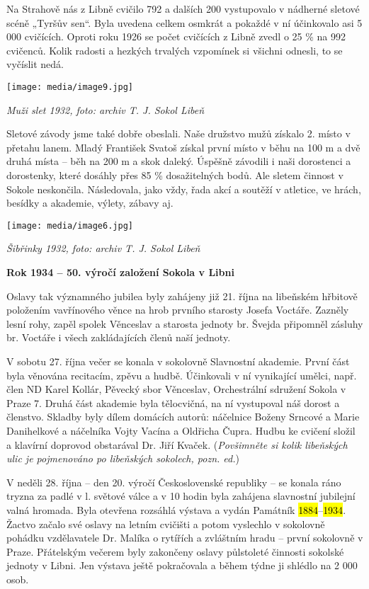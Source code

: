 Na Strahově nás z Libně cvičilo 792 a dalších 200 vystupovalo v nádherné
sletové scéně „Tyršův sen``. Byla uvedena celkem osmkrát a pokaždé v ní
účinkovalo asi 5 000 cvičících. Oproti roku 1926 se počet cvičících z
Libně zvedl o 25 \% na 992 cvičenců. Kolik radosti a hezkých trvalých
vzpomínek si všichni odnesli, to se vyčíslit nedá.

\texttt{[image: media/image9.jpg]}

\emph{Muži slet 1932, foto: archiv T. J. Sokol Libeň}

Sletové závody jsme také dobře obeslali. Naše družstvo mužů získalo 2.
místo v přetahu lanem. Mladý František Svatoš získal první místo v běhu
na 100 m a dvě druhá místa -- běh na 200 m a skok daleký. Úspěšně
závodili i naši dorostenci a dorostenky, které dosáhly přes 85 \%
dosažitelných bodů. Ale sletem činnost v Sokole neskončila. Následovala,
jako vždy, řada akcí a soutěží v atletice, ve hrách, besídky a akademie,
výlety, zábavy aj.

\texttt{[image: media/image6.jpg]}

\emph{Šibřinky 1932, foto: archiv T. J. Sokol Libeň}

\textbf{Rok 1934 -- 50. výročí založení Sokola v Libni}

Oslavy tak významného jubilea byly zahájeny již 21. října na libeňském
hřbitově položením vavřínového věnce na hrob prvního starosty Josefa
Voctáře. Zazněly lesní rohy, zapěl spolek Věnceslav a starosta jednoty
br. Švejda připomněl zásluhy br. Voctáře i všech zakládajících členů
naší jednoty.

V sobotu 27. října večer se konala v sokolovně Slavnostní akademie.
První část byla věnována recitacím, zpěvu a hudbě. Účinkovali v ní
vynikající umělci, např. člen ND Karel Kollár, Pěvecký sbor Věnceslav,
Orchestrální sdružení Sokola v Praze 7. Druhá část akademie byla
tělocvičná, na ní vystupoval náš dorost a členstvo. Skladby byly dílem
domácích autorů: náčelnice Boženy Srncové a Marie Danihelkové a
náčelníka Vojty Vacína a Oldřicha Čupra. Hudbu ke cvičení složil a
klavírní doprovod obstarával Dr. Jiří Kvaček. (\emph{Povšimněte si kolik
libeňských ulic je pojmenováno po libeňských sokolech, pozn. ed.})

V neděli 28. října -- den 20. výročí Československé republiky -- se
konala ráno tryzna za padlé v l. světové válce a v 10 hodin byla
zahájena slavnostní jubilejní valná hromada. Byla otevřena rozsáhlá
výstava a vydán Památník \hl{1884}--\hl{1934}. Žactvo začalo své oslavy
na letním cvičišti a potom vyslechlo v sokolovně pohádku vzdělavatele
Dr. Malíka o rytířích a zvláštním hradu -- první sokolovně v Praze.
Přátelským večerem byly zakončeny oslavy půlstoleté činnosti sokolské
jednoty v Libni. Jen výstava ještě pokračovala a během týdne ji shlédlo
na 2 000 osob.


